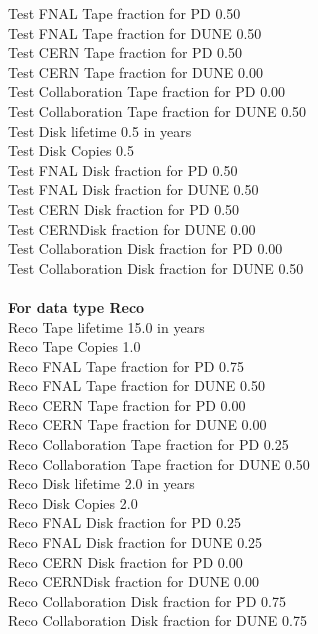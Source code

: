 \documentclass[12pt]{article}
\begin{document}
  Test FNAL Tape fraction for PD  0.50\\
  Test FNAL Tape fraction for DUNE  0.50\\
  Test CERN Tape fraction for PD  0.50\\
  Test CERN Tape fraction for DUNE  0.00\\
  Test Collaboration Tape fraction for PD  0.00\\
  Test Collaboration Tape fraction for DUNE  0.50\\
  Test Disk lifetime   0.5 in years\\
  Test Disk Copies   0.5\\
  Test FNAL Disk fraction for PD  0.50\\
  Test FNAL Disk fraction for DUNE  0.50\\
  Test CERN Disk fraction for PD  0.50\\
  Test CERNDisk fraction for DUNE  0.00\\
  Test Collaboration Disk fraction for PD  0.00\\
  Test Collaboration Disk fraction for DUNE  0.50\\
\\
{\bf For data type Reco}\\
  Reco Tape lifetime  15.0 in years\\
  Reco Tape Copies   1.0\\
  Reco FNAL Tape fraction for PD  0.75\\
  Reco FNAL Tape fraction for DUNE  0.50\\
  Reco CERN Tape fraction for PD  0.00\\
  Reco CERN Tape fraction for DUNE  0.00\\
  Reco Collaboration Tape fraction for PD  0.25\\
  Reco Collaboration Tape fraction for DUNE  0.50\\
  Reco Disk lifetime   2.0 in years\\
  Reco Disk Copies   2.0\\
  Reco FNAL Disk fraction for PD  0.25\\
  Reco FNAL Disk fraction for DUNE  0.25\\
  Reco CERN Disk fraction for PD  0.00\\
  Reco CERNDisk fraction for DUNE  0.00\\
  Reco Collaboration Disk fraction for PD  0.75\\
  Reco Collaboration Disk fraction for DUNE  0.75\\
\\
\end{document}

